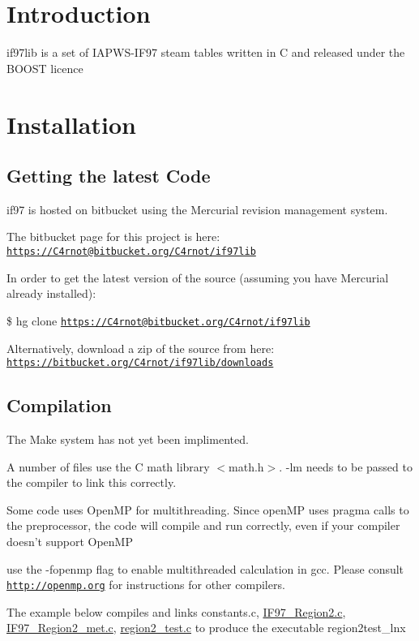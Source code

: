 \hypertarget{index_intro_sec}{}\section{Introduction}\label{index_intro_sec}
if97lib is a set of I\-A\-P\-W\-S-\/\-I\-F97 steam tables written in C and released under the B\-O\-O\-S\-T licence\hypertarget{index_install_sec}{}\section{Installation}\label{index_install_sec}
\hypertarget{index_step1}{}\subsection{Getting the latest Code}\label{index_step1}
if97 is hosted on bitbucket using the Mercurial revision management system.

The bitbucket page for this project is here\-: \href{https://C4rnot@bitbucket.org/C4rnot/if97lib}{\tt https\-://\-C4rnot@bitbucket.\-org/\-C4rnot/if97lib}

In order to get the latest version of the source (assuming you have Mercurial already installed)\-:

\$ hg clone \href{https://C4rnot@bitbucket.org/C4rnot/if97lib}{\tt https\-://\-C4rnot@bitbucket.\-org/\-C4rnot/if97lib}

Alternatively, download a zip of the source from here\-: \href{https://bitbucket.org/C4rnot/if97lib/downloads}{\tt https\-://bitbucket.\-org/\-C4rnot/if97lib/downloads}\hypertarget{index_step2}{}\subsection{Compilation}\label{index_step2}
The Make system has not yet been implimented.

A number of files use the C math library $<$math.\-h$>$. -\/lm needs to be passed to the compiler to link this correctly.

Some code uses Open\-M\-P for multithreading. Since open\-M\-P uses pragma calls to the preprocessor, the code will compile and run correctly, even if your compiler doesn't support Open\-M\-P

use the -\/fopenmp flag to enable multithreaded calculation in gcc. Please consult \href{http://openmp.org}{\tt http\-://openmp.\-org} for instructions for other compilers.

The example below compiles and links constants.\-c, \hyperlink{IF97__Region2_8c_source}{I\-F97\-\_\-\-Region2.\-c}, \hyperlink{IF97__Region2__met_8c_source}{I\-F97\-\_\-\-Region2\-\_\-met.\-c}, \hyperlink{region2__test_8c_source}{region2\-\_\-test.\-c} to produce the executable region2test\-\_\-lnx

